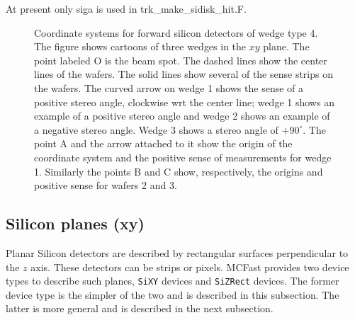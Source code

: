 At present only siga is used in trk\_make\_sidisk\_hit.F.
\filbreak

\begin{figure} [htbp]
\centerline{\epsfxsize=4.5in }
\caption{\label{wedge_coord} Coordinate systems for forward silicon
detectors of wedge type 4. The figure shows cartoons of three wedges
in the $xy$ plane.  The point labeled O is the beam spot.
The dashed lines show the center lines of the wafers.
The solid lines show several of the sense strips on the wafers.
The curved arrow on wedge 1 shows the sense of a positive stereo angle,
clockwise wrt the center line; wedge 1 shows an example
of a positive stereo angle and wedge 2 shows an example of a negative
stereo angle. Wedge 3 shows a stereo angle of $+90^{\circ}$.  
The point A and the arrow attached to it show the origin of the coordinate
system and the positive sense of measurements for wedge 1.  Similarly
the points B and C show, respectively, the origins and positive sense
for wafers 2 and 3.
}
\end{figure}


\subsection{Silicon planes (xy)}

Planar Silicon detectors are described by rectangular surfaces 
perpendicular to the $z$ axis. These detectors can be strips or pixels.
MCFast provides two device types to describe such planes,
{\tt SiXY} devices and {\tt SiZRect} devices.  The former device type is
the simpler of the two and is described in this subsection.  The latter
is more general and is described in the next subsection.

